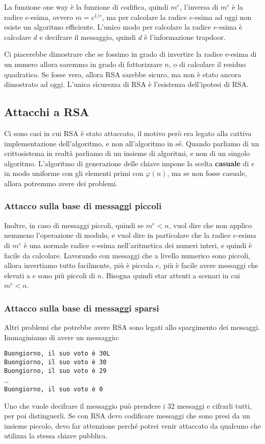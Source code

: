 La funzione one way è la funzione di codifica, quindi $m^e$, l'inversa di 
$m^e$ è la radice $e$-esima, ovvero $m = c^{1/e}$, ma per calcolare la radice $e$-esima
ad oggi non esiste un algoritmo efficiente. L'unico modo per calcolare la radice $e$-esima
è calcolare $d$ e decifrare il messaggio, quindi $d$ è l'informazione trapdoor.

Ci piacerebbe dimostrare che se fossimo in grado di invertire la radice 
e-esima di un numero allora saremmo in grado di fattorizzare $n$, o di calcolare 
il residuo quadratico. Se fosse vero, allora RSA sarebbe sicuro, ma non è stato ancora
dimostrato ad oggi. L'unica sicurezza di RSA è l'esistenza dell'ipotesi di RSA.
\subsection{Attacchi a RSA}
Ci sono casi in cui RSA è stato attaccato, il motivo però era legato alla cattiva 
implementazione dell'algoritmo, e non all'algoritmo in sé.
Quando parliamo di un crittosistema in realtà parliamo di un insieme di algoritmi,
e non di un singolo algoritmo. L'algoritmo di generazione delle chiave impone 
la scelta \textbf{casuale} di $e$ in modo uniforme con gli elementi 
primi con $\varphi(n)$, ma se non fosse casuale, allora potremmo avere dei problemi.
\subsubsection{Attacco sulla base di messaggi piccoli}
Inoltre, in caso di messaggi piccoli, quindi se $m^e < n$, vuol dire che 
non applico nemmeno l'operazione di modulo, e vuol dire in particolare che 
la radice $e$-esima di $m^e$ è una normale radice $e$-esima nell'aritmetica 
dei numeri interi, e quindi è facile da calcolare.
Lavorando con messaggi che a livello numerico sono piccoli, allora 
invertiamo tutto facilmente, più è piccola $e$, più è facile avere 
messaggi che elevati a $e$ sono più piccoli di $n$. Bisogna quindi
star attenti a scenari in cui $m^e < n$.
\subsubsection{Attacco sulla base di messaggi sparsi}
Altri problemi che potrebbe avere RSA sono legati allo spargimento dei 
messaggi.
Immaginiamo di avere un messaggio:

\begin{center}
  \texttt{Buongiorno, il suo voto è 30L}\\
  \texttt{Buongiorno, il suo voto è 30}\\
  \texttt{Buongiorno, il suo voto è 29}\\
  \dots\\
  \texttt{Buongiorno, il suo voto è 0}\\
\end{center}
Uno che vuole decifrare il messaggio può prendere i $32$ messaggi e
cifrarli tutti, per poi distinguerli.
Se con RSA devo codificare messaggi che sono presi da un insieme piccolo,
devo far attenzione perché potrei venir attaccato da qualcuno che utilizza 
la stessa chiave pubblica.
